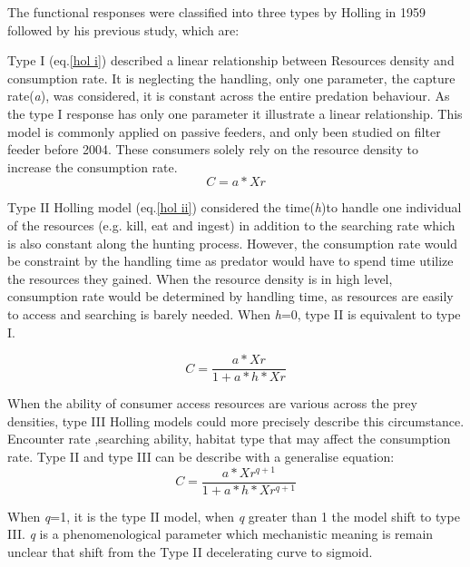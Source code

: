 \documentclass[11pt, a4paper]{article}
\begin{document}
The functional responses were classified into three types by Holling in 1959 followed by his previous study\cite{Holling1959b}, which are:

Type I (eq.\ref{hol i}) described a linear relationship between Resources density and consumption rate. It is neglecting the handling,  only one parameter, the capture rate(\textit{a}), was considered, it is constant across the entire predation behaviour. As the type I response has only one parameter it illustrate a linear relationship. This model is commonly applied on passive feeders, and only been studied on filter feeder before 2004\cite{Jeschke2004}. These consumers solely rely on the resource density to increase the  consumption rate.
\begin{equation}\label{hol i}
 C = a * Xr 
\end{equation}

Type II Holling model (eq.\ref{hol ii}) considered the time(\textit{h})to handle one individual of the resources (e.g. kill, eat and ingest) in addition to the searching rate which is also constant along the hunting process. However, the consumption rate would be constraint by the handling time as predator would have to spend time utilize the resources they gained. When the resource density is in high level, consumption rate would be determined by handling time, as resources are easily to access and searching is barely needed. When \textit{h}=0, type II is equivalent to type I. 

\begin{equation}\label{hol ii}
C = \frac{a *Xr}{1+a*h*Xr}
\end{equation}

When the ability of consumer access resources are various across the prey densities, type III Holling models could more precisely describe this circumstance. Encounter rate ,searching ability, habitat type that may affect the consumption rate. Type II and type III can be describe with a generalise equation: 
\begin{equation}\label{hol g}
C = \frac{a*Xr^{q+1}}{1+a*h*Xr^{q+1}}
\end{equation}

When \textit{q}=1, it is the type II model, when \textit{q} greater than 1 the model shift to type III. \textit{q} is a phenomenological parameter which mechanistic meaning is remain unclear that shift from the Type II decelerating curve to sigmoid\cite{Real1977}\cite{Dunn2020}.
\end{document}

